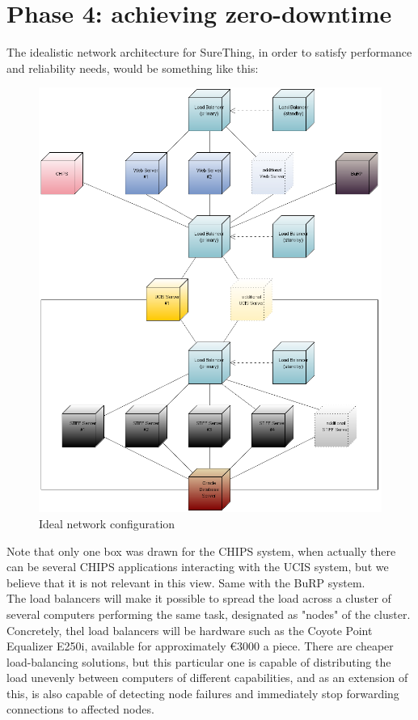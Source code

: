\section{Phase 4: achieving zero-downtime}

The idealistic network architecture for SureThing, in order to satisfy
performance and reliability needs, would be something like this:\\

\begin{figure}
\includegraphics[width=\linewidth]{img/net_4.png}
\caption{Ideal network configuration}
\label{fig:net_4}
\end{figure}

Note that only one box was drawn for the CHIPS system, when actually there
can be several CHIPS applications interacting with the UCIS system, but we
believe that it is not relevant in this view. Same with the BuRP system.\\

The load balancers will make it possible to spread the load across a cluster
of several computers performing the same task, designated as "nodes" of the
cluster. Concretely, thel load balancers will be hardware such as the Coyote Point Equalizer
E250i, available for approximately \euro3000 a piece. There are cheaper
load-balancing solutions, but this particular one is capable of distributing
the load unevenly between computers of different capabilities, and as an
extension of this, is also capable of detecting node failures and immediately
stop forwarding connections to affected nodes.

